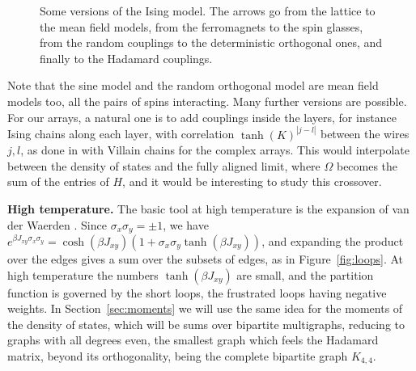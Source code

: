 \documentclass[11pt,a4paper]{article}
\theoremstyle{remark}
\begin{document}
\begin{figure}[htb!]
\centering
{}
\caption{Some versions of the Ising model. The arrows go from the lattice to the mean field models, from the ferromagnets to the spin glasses, from the random couplings to the deterministic orthogonal ones, and finally to the Hadamard couplings.}\label{fig:tree}
\end{figure}

Note that the sine model and the random orthogonal model are mean field models too, all the pairs of spins interacting. Many further versions are possible. For our arrays, a natural one is to add couplings inside the layers, for instance Ising chains along each layer, with correlation $\tanh(K)^{|j-l|}$ between the wires $j,l$, as done in \cite{cot} with Villain chains for the complex arrays. This would interpolate between the density of states and the fully aligned limit, where $\Omega$ becomes the sum of the entries of $H$, and it would be interesting to study this crossover.

\medskip

\noindent\textbf{High temperature.} The basic tool at high temperature is the expansion of van der Waerden \cite{vdw}. Since $\sigma_x\sigma_y=\pm1$, we have $e^{\beta J_{xy}\sigma_x\sigma_y}=\cosh(\beta J_{xy})(1+\sigma_x\sigma_y\tanh(\beta J_{xy}))$, and expanding the product over the edges gives a sum over the subsets of edges, as in Figure~\ref{fig:loops}. At high temperature the numbers $\tanh(\beta J_{xy})$ are small, and the partition function is governed by the short loops, the frustrated loops having negative weights. In Section~\ref{sec:moments} we will use the same idea for the moments of the density of states, which will be sums over bipartite multigraphs, reducing to graphs with all degrees even, the smallest graph which feels the Hadamard matrix, beyond its orthogonality, being the complete bipartite graph $K_{4,4}$.
\end{document}

